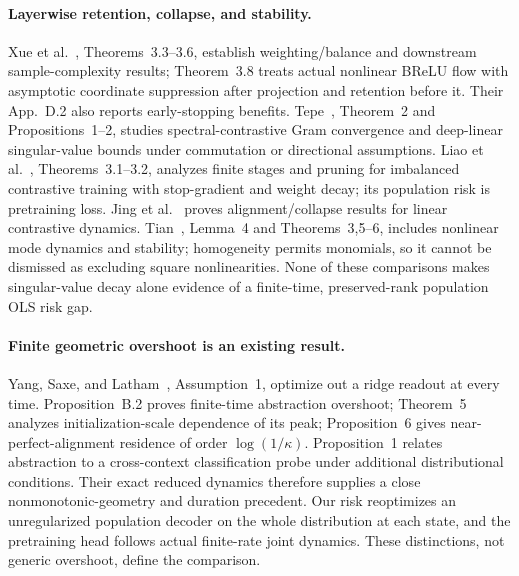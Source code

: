 \paragraph{Layerwise retention, collapse, and stability.}
Xue et al.~\cite{xue2024benefits}, Theorems~3.3--3.6, establish weighting/balance and downstream sample-complexity results; Theorem~3.8 treats actual nonlinear BReLU flow with asymptotic coordinate suppression after projection and retention before it. Their App.~D.2 also reports early-stopping benefits. Tepe~\cite{tepe2024dynamics}, Theorem~2 and Propositions~1--2, studies spectral-contrastive Gram convergence and deep-linear singular-value bounds under commutation or directional assumptions. Liao et al.~\cite{liao2026imbalanced}, Theorems~3.1--3.2, analyzes finite stages and pruning for imbalanced contrastive training with stop-gradient and weight decay; its population risk is pretraining loss. Jing et al.~\cite{jing2022collapse} proves alignment/collapse results for linear contrastive dynamics. Tian~\cite{tian2023nonlinearity}, Lemma~4 and Theorems~3,5--6, includes nonlinear mode dynamics and stability; homogeneity permits monomials, so it cannot be dismissed as excluding square nonlinearities. None of these comparisons makes singular-value decay alone evidence of a finite-time, preserved-rank population OLS risk gap.

\paragraph{Finite geometric overshoot is an existing result.}
Yang, Saxe, and Latham~\cite{yang2026abstraction}, Assumption~1, optimize out a ridge readout at every time. Proposition~B.2 proves finite-time abstraction overshoot; Theorem~5 analyzes initialization-scale dependence of its peak; Proposition~6 gives near-perfect-alignment residence of order $\log(1/\kappa)$. Proposition~1 relates abstraction to a cross-context classification probe under additional distributional conditions. Their exact reduced dynamics therefore supplies a close nonmonotonic-geometry and duration precedent. Our risk reoptimizes an unregularized population decoder on the whole distribution at each state, and the pretraining head follows actual finite-rate joint dynamics. These distinctions, not generic overshoot, define the comparison.

